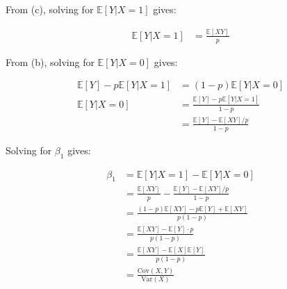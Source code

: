 \documentclass[10pt]{article}
\newcommand{\E}{\mathbb{E}}
\newenvironment{problem}[2][Problem]{\begin{trivlist}
\item[\hskip \labelsep {\bfseries #1}\hskip \labelsep {\bfseries #2.}]}{\end{trivlist}}
\begin{document}
\begin{problem}{4}
\begin{enumerate}
            From (c), solving for $\E[Y | X = 1]$ gives:

            \begin{align*}
                \E[Y | X = 1] &= \frac{\E[XY]}{p}
            \end{align*}

            From (b), solving for $\E[Y | X = 0]$ gives:

            \begin{align*}
                \E[Y]-p\E[Y | X = 1] &= (1-p)\E[Y | X = 0] \\
                \E[Y | X = 0] &= \frac{\E[Y] - p\E[Y | X = 1]}{1-p} \\
                              &= \frac{\E[Y] - \E[XY]/p}{1-p}
            \end{align*}

            Solving for $\beta_1$ gives:

            \begin{align*}
            \beta_1 &= \E[Y | X = 1] - \E[Y | X = 0] \\
                    &= \frac{\E[XY]}{p} - \frac{\E[Y] - \E[XY]/p}{1-p} \\
                    &= \frac{(1-p)\E[XY] - p\E[Y] + \E[XY]}{p(1-p)} \\
                    &= \frac{\E[XY] - \E[Y]\cdot p}{p(1-p)} \\
                    &= \frac{\E[XY] - \E[X]\E[Y]}{p(1-p)} \\
                    &= \frac{\text{Cov}(X,Y)}{\text{Var}(X)}
            \end{align*}

    \end{enumerate}
\end{problem}
\end{document}
